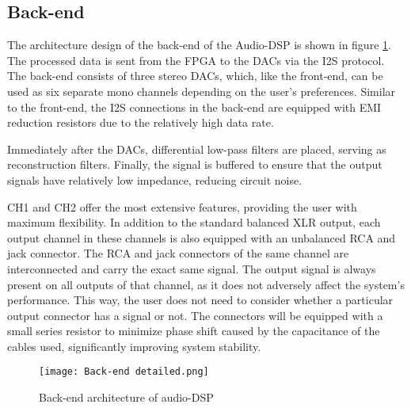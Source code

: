 
\subsection{Back-end}
The architecture design of the back-end of the Audio-DSP is shown in figure \ref{fig:arch-back-end}. The processed data is sent from the FPGA to the DACs via the I2S protocol. The back-end consists of three stereo DACs, which, like the front-end, can be used as six separate mono channels depending on the user's preferences. Similar to the front-end, the I2S connections in the back-end are equipped with EMI reduction resistors due to the relatively high data rate.

Immediately after the DACs, differential low-pass filters are placed, serving as reconstruction filters. Finally, the signal is buffered to ensure that the output signals have relatively low impedance, reducing circuit noise.

CH1 and CH2 offer the most extensive features, providing the user with maximum flexibility. In addition to the standard balanced XLR output, each output channel in these channels is also equipped with an unbalanced RCA and jack connector. The RCA and jack connectors of the same channel are interconnected and carry the exact same signal. The output signal is always present on all outputs of that channel, as it does not adversely affect the system's performance. This way, the user does not need to consider whether a particular output connector has a signal or not. The connectors will be equipped with a small series resistor to minimize phase shift caused by the capacitance of the cables used, significantly improving system stability.

\begin{figure}[ht]
    \texttt{[image: Back-end detailed.png]}\\    
    \caption{Back-end architecture of audio-DSP}
    \label{fig:arch-back-end}
\end{figure}

